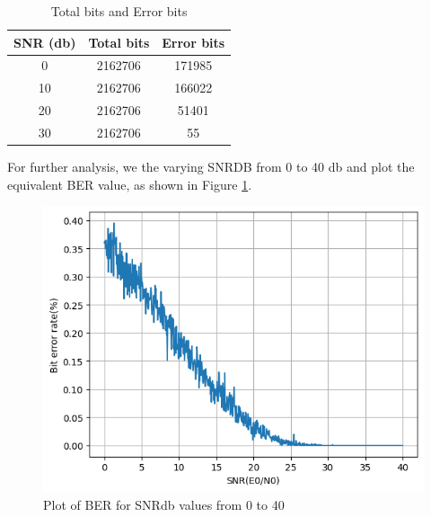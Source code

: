 \begin{table}[htbp]
    \centering
    \begin{tabular}{|c|c|c|}
        \hline
        SNR (db) & Total bits & Error bits \\ \hline
        0        & 2162706    &  171985 \\ \hline
        10       & 2162706    &  166022 \\ \hline
        20       & 2162706    &  51401  \\ \hline
        30       & 2162706    &  55     \\ \hline
    \end{tabular}
    \caption{Total bits and Error bits}
    \label{errors}
\end{table}

For further analysis, we the varying SNRDB from 0 to 40 db and plot the equivalent BER value, as shown in Figure \ref{ber}.

\begin{figure}[htbp]
    \centering
    \includegraphics[width=\linewidth]{../Source/results/ber}
    \caption{Plot of BER for SNRdb values from 0 to 40}
    \label{ber}
\end{figure}

